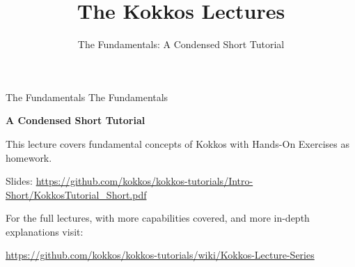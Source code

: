 
\def\sandid{SAND2020-7475 PE}

\title{The Kokkos Lectures}

\author{The Fundamentals: A Condensed Short Tutorial}




\shorttrue
\mediumfalse
\fullfalse



% 

\begin{frame}
	\titlepage
\end{frame}

\begin{frame}{The Fundamentals}
	{\huge The Fundamentals}

	\textbf{A Condensed Short Tutorial}

	\vspace{10pt}
	This lecture covers fundamental concepts of Kokkos with Hands-On Exercises as homework.

	Slides: \url{https://github.com/kokkos/kokkos-tutorials/Intro-Short/KokkosTutorial_Short.pdf}

	\vspace{20pt}
	For the full lectures, with more capabilities covered, and more in-depth explanations visit:

	\url{https://github.com/kokkos/kokkos-tutorials/wiki/Kokkos-Lecture-Series}
\end{frame}



